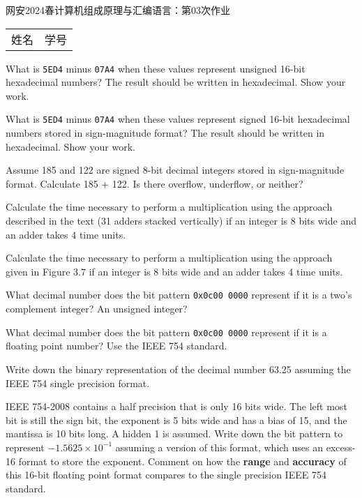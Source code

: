 \documentclass[a4paper]{ctexart}
\begin{document}
\begin{center}
{\Large
网安2024春计算机组成原理与汇编语言：第03次作业
}
\end{center}

\begin{flushleft}
\begin{tabularx}{0.5\textwidth}{ >{\raggedright}X >{\raggedright}X }
姓名&学号\\
\end{tabularx}
\end{flushleft}


What is \verb|5ED4| minus \verb|07A4| when these values represent unsigned 16-bit hexadecimal numbers?
The result should be written in hexadecimal. Show your work.

What is \verb|5ED4| minus \verb|07A4| when these values represent signed 16-bit hexadecimal numbers
stored in sign-magnitude format? The result should be written in hexadecimal. Show your work.

Assume 185 and 122 are signed 8-bit decimal integers stored in sign-magnitude format.
Calculate 185 + 122.
Is there overflow, underflow, or neither?

Calculate the time necessary to perform a multiplication using the approach described in the text
(31 adders stacked vertically)
if an integer is 8 bits wide and an adder takes 4 time units.

Calculate the time necessary to perform a multiplication using the approach given in Figure 3.7
if an integer is 8 bits wide and an adder takes 4 time units.

What decimal number does the bit pattern \verb|0x0c00 0000| represent
if it is a two's complement integer? An unsigned integer?

What decimal number does the bit pattern \verb|0x0c00 0000| represent
if it is a floating point number?
Use the IEEE 754 standard.

Write down the binary representation of the decimal number 63.25
assuming the IEEE 754 single precision format.

IEEE 754-2008 contains a half precision that is only 16 bits wide.
The left most bit is still the sign bit, the exponent is 5 bits wide and has a bias of 15,
and the mantissa is 10 bits long.
A hidden 1 is assumed.
Write down the bit pattern to represent $-1.5625 \times {10}^{-1}$ assuming a version of this format,
which uses an excess-16 format to store the exponent.
Comment on how the \textbf{range} and \textbf{accuracy} of this 16-bit floating point format
compares to the single precision IEEE 754 standard.
\end{document}
